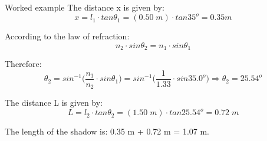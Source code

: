 {\begin{frame}{Worked example}
The distance x is given by:
\begin{equation*}
    x=l_1 \cdot tan\theta_1 = (0.50 \; m) \cdot tan35^{o} = 0.35 m
\end{equation*}

According to the law of refraction:
\begin{equation*}
   n_2 \cdot  sin\theta_2 = n_1 \cdot sin\theta_1
\end{equation*}

Therefore:
\begin{equation*}
  \theta_2 = sin^{-1} \Big( \frac{n_1}{n_2} \cdot sin\theta_1 \Big)
                = sin^{-1} \Big( \frac{1}{1.33} \cdot sin35.0^{o} \Big) \Rightarrow \theta_2 = 25.54^{o}
\end{equation*}

The distance L is given by:
\begin{equation*}
   L = l_2 \cdot tan\theta_2 = (1.50\; m) \cdot tan25.54^{o} = 0.72 \; m
\end{equation*}

The length of the shadow is: 0.35 m  + 0.72 m = 1.07 m.

\end{frame}

} %

%
%
%

